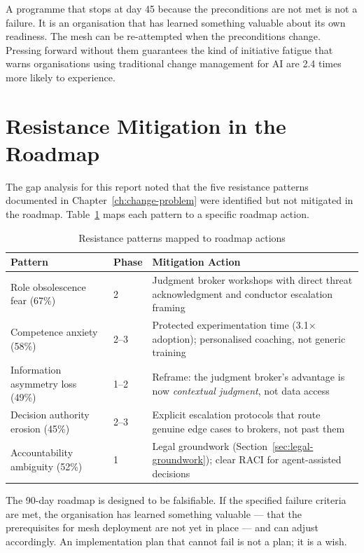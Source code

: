 \begin{keyinsight}
A programme that stops at day 45 because the preconditions are not met is not a failure. It is an organisation that has learned something valuable about its own readiness. The mesh can be re-attempted when the preconditions change. Pressing forward without them guarantees the kind of initiative fatigue that \textcite{Gartner2025} warns organisations using traditional change management for AI are 2.4 times more likely to experience.
\end{keyinsight}

\section{Resistance Mitigation in the Roadmap}

The gap analysis for this report noted that the five resistance patterns documented in Chapter~\ref{ch:change-problem} were identified but not mitigated in the roadmap. Table~\ref{tab:resistance-mitigation} maps each pattern to a specific roadmap action.

\begin{table}[H]
\centering
\caption{Resistance patterns mapped to roadmap actions}
\label{tab:resistance-mitigation}
\begin{tabularx}{\textwidth}{l l X}
\toprule
\textbf{Pattern} & \textbf{Phase} & \textbf{Mitigation Action} \\
\midrule
Role obsolescence fear (67\%) & 2 & Judgment broker workshops with direct threat acknowledgment and conductor escalation framing \\
\addlinespace
Competence anxiety (58\%) & 2--3 & Protected experimentation time (3.1$\times$ adoption); personalised coaching, not generic training \\
\addlinespace
Information asymmetry loss (49\%) & 1--2 & Reframe: the judgment broker's advantage is now \emph{contextual judgment}, not data access \\
\addlinespace
Decision authority erosion (45\%) & 2--3 & Explicit escalation protocols that route genuine edge cases to brokers, not past them \\
\addlinespace
Accountability ambiguity (52\%) & 1 & Legal groundwork (Section~\ref{sec:legal-groundwork}); clear RACI for agent-assisted decisions \\
\bottomrule
\end{tabularx}
\end{table}

The 90-day roadmap is designed to be falsifiable. If the specified failure criteria are met, the organisation has learned something valuable --- that the prerequisites for mesh deployment are not yet in place --- and can adjust accordingly. An implementation plan that cannot fail is not a plan; it is a wish.

